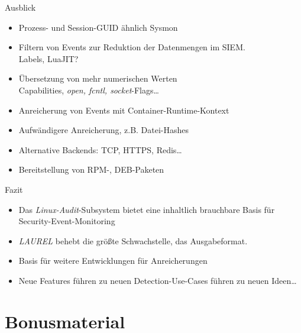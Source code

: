 \documentclass[xcolor={dvipsnames},aspectratio=169]{beamer}
\begin{document}
\begin{frame}{Ausblick}
  \begin{itemize}
  \item Prozess- und Session-GUID ähnlich Sysmon
  \item Filtern von Events zur Reduktion der Datenmengen im SIEM.\\
    {\small{}Labels, LuaJIT?}
  \item Übersetzung von mehr numerischen Werten\\
    {\small{}Capabilities, \emph{open, fcntl, socket}-Flags\dots}
  \item Anreicherung von Events mit Container-Runtime-Kontext
  \item Aufwändigere Anreicherung, z.B. Datei-Hashes
  \item Alternative Backends: TCP, HTTPS, Redis\dots
  \item Bereitstellung von RPM-, DEB-Paketen
  \end{itemize}
\end{frame}

\begin{frame}{Fazit}
  \begin{itemize}
  \item Das \emph{Linux-Audit}-Subsystem bietet eine inhaltlich
    brauchbare Basis für Security-Event-Monitoring
  \item \emph{LAUREL} behebt die größte Schwachstelle, das Ausgabeformat.
  \item Basis für weitere Entwicklungen für Anreicherungen
  \item Neue Features führen zu neuen Detection-Use-Cases führen zu neuen Ideen\dots
  \end{itemize}
\end{frame}

\appendix

\section{Bonusmaterial}
\end{document}
